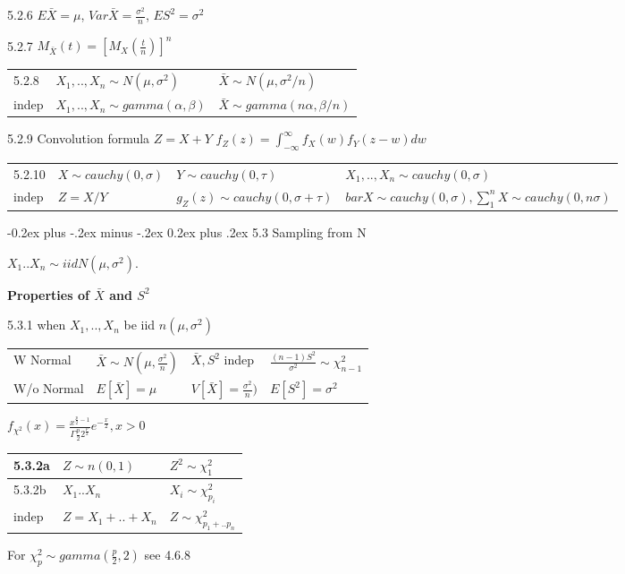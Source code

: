 \documentclass[10pt,landscape]{article}
\makeatletter
\renewcommand{\subsection}{\@startsection{subsection}{2}{0mm}%
                                {-0.2ex plus -.2ex minus -.2ex}%
                                {0.2ex plus .2ex}%
                                {\normalfont\normalsize\bfseries}}
\makeatother
\begin{document}
\begin{multicols}{1}
5.2.6 $E\bar X=\mu$, $Var\bar X=\frac{\sigma^2}n$, $ES^2=\sigma^2$

5.2.7 $M_{\bar X}(t)=[M_X(\frac{t}n)]^n$

\begin{tabular}{l|l|l}
5.2.8 & $X_1,.., X_n\sim N(\mu,\sigma^2)$ & $\bar X\sim N(\mu,\sigma^2/n)$\\
indep & $X_1,.., X_n\sim gamma(\alpha,\beta)$ & $\bar X\sim gamma(n\alpha,\beta/n)$
\end{tabular}

5.2.9 Convolution formula $Z=X+Y$ $f_Z(z) =\int_{-\infty}^{\infty}f_X(w)f_Y(z-w)dw$

\begin{tabular}{l|l|l|l}
5.2.10 & $X\sim cauchy(0,\sigma)$ & $Y\sim cauchy(0,\tau)$ & $X_1,.., X_n\sim cauchy(0,\sigma)$\\
indep & $Z=X/Y$ & $g_Z(z)\sim cauchy(0,\sigma+\tau)$ & $bar X\sim cauchy(0,\sigma),\sum_{1}^{n} X\sim cauchy(0,n\sigma)$
\end{tabular}


\subsection{5.3 Sampling from N}

$X_1..X_n\sim iid N(\mu,\sigma^2)$. 

\textbf{Properties of $\bar X$ and $S^2$}

5.3.1 when $X_1,..,X_n$ be iid $n(\mu,\sigma^2)$
\begin{tabular}{l|lll}
W  Normal& $\bar X\sim N(\mu,\frac{\sigma^2}n)$ & $\bar X,S^2$ indep & $\frac{(n-1)S^2}{\sigma^2}\sim\chi^2_{n-1}$\\
W/o Normal & $E[\bar X]=\mu$ & $V[\bar X]=\frac{\sigma^2}n)$ & $E[S^2]=\sigma^2$\\\hline
\end{tabular}

$f_{\chi^2}(x)=\frac{x^{\frac{p}2-1}}{\Gamma \frac{p}2 2^{\frac{p}2}}e^{-\frac{x}2}, x>0$

\begin{tabular}{ l|l|l }
5.3.2a & $Z\sim n(0,1)$ & $Z^2\sim \chi^2_1$ \\ \hline
5.3.2b & $X_1..X_n$     & $X_i\sim \chi^2_{p_i}$\\
indep  & $Z=X_1+..+X_n$ & $Z\sim \chi^2_{p_1+..p_n}$
\end{tabular}

For $\chi^2_{p}\sim gamma(\frac{p}2,2)$ see 4.6.8


\end{multicols}
\end{document}
